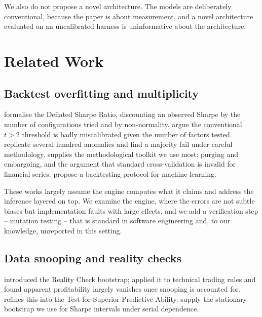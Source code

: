 \documentclass[preprint,12pt,authoryear]{elsarticle}
\begin{document}
We also do not propose a novel architecture. The models are deliberately
conventional, because the paper is about measurement, and a novel architecture
evaluated on an uncalibrated harness is uninformative about the architecture.

\section{Related Work}
\label{sec:related}

\subsection{Backtest overfitting and multiplicity}

\citet{bailey2014deflated} formalise the Deflated Sharpe Ratio, discounting an
observed Sharpe by the number of configurations tried and by non-normality.
\citet{harvey2016cross} argue the conventional $t > 2$ threshold is badly
miscalibrated given the number of factors tested. \citet{hou2020replicating}
replicate several hundred anomalies and find a majority fail under careful
methodology. \citet{lopezdeprado2018advances} supplies the methodological
toolkit we use most: purging and embargoing, and the argument that standard
cross-validation is invalid for financial series. \citet{arnott2019backtesting}
propose a backtesting protocol for machine learning.

These works largely assume the engine computes what it claims and address the
inference layered on top. We examine the engine, where the errors are not subtle
biases but implementation faults with large effects, and we add a verification
step -- mutation testing -- that is standard in software engineering
\citep{jia2011analysis} and, to our knowledge, unreported in this setting.

\subsection{Data snooping and reality checks}

\citet{white2000reality} introduced the Reality Check bootstrap;
\citet{sullivan1999data} applied it to technical trading rules and found
apparent profitability largely vanishes once snooping is accounted for.
\citet{hansen2005test} refines this into the Test for Superior Predictive
Ability. \citet{politis1994stationary} supply the stationary bootstrap we use
for Sharpe intervals under serial dependence.
\end{document}
